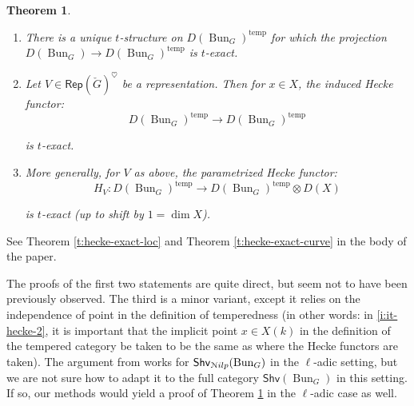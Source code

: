\documentclass[reqno,11pt]{amsart}
\numberwithin{equation}{subsection}
\newtheorem{introthm}{Theorem}
\theoremstyle{remark}
\newcommand{\sN}{{\EuScript N}}
\newcommand{\on}{\operatorname}
\newcommand{\Rep}{\mathsf{Rep}}
\newcommand{\Bun}{\on{Bun}}
\newcommand{\heart}{\heartsuit}
\newcommand{\Shv}{\mathsf{Shv}}
\newcommand{\temp}{\on{temp}}
\newcommand{\Nilp}{\sN ilp}
\begin{document}
\begin{introthm}\label{it:hecke}

\begin{enumerate}

\item There is a unique $t$-structure on $D(\Bun_G)^{\temp}$
for which the projection $D(\Bun_G) \to D(\Bun_G)^{\temp}$
is $t$-exact.

\item\label{i:it-hecke-2} Let $V \in \Rep(\check{G})^{\heart}$ be a representation.
Then for $x \in X$, the induced Hecke functor:
%
\[
D(\Bun_G)^{\temp} \to D(\Bun_G)^{\temp}
\]

\noindent is $t$-exact.

\item More generally, for $V$ as above, the \emph{parametrized} Hecke
functor:
%
\[
H_V:D(\Bun_G)^{\temp} \to D(\Bun_G)^{\temp} \otimes D(X)
\]

\noindent is $t$-exact (up to shift by $1 = \dim X$).

\end{enumerate}

\end{introthm}

See Theorem \ref{t:hecke-exact-loc} and Theorem \ref{t:hecke-exact-curve}
in the body of the paper.

The proofs of the first two statements are quite direct,
but seem not to have been previously observed.
The third is a minor variant, except it relies on the
independence of point in the definition of temperedness
(in other words: in \eqref{i:it-hecke-2}, it is important
that the implicit point $x \in X(k)$ in the definition of
the tempered category be taken to be the same as where the Hecke
functors are taken).
The argument from \cite{independence} works for
$\Shv_{\Nilp}(\Bun_G)$ in the $\ell$-adic setting, but 
we are not sure how to adapt it to the full category
$\Shv(\Bun_G)$ in this setting. If so, our methods would
yield a proof of Theorem \ref{it:hecke} in the $\ell$-adic case as well.
\end{document}
